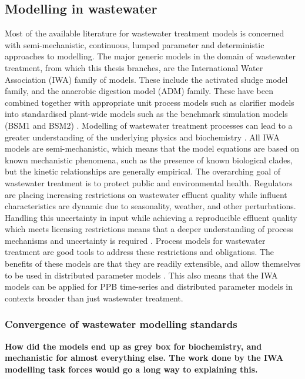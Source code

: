\subsection{Modelling in wastewater}

Most of the available literature for wastewater treatment models is concerned with semi-mechanistic, continuous, lumped parameter and deterministic approaches to modelling. The major generic models in the domain of wastewater treatment, from which this thesis branches, are the International Water Association (IWA) family of models. These include the activated sludge model family, and the anaerobic digestion model (ADM) \cite{batstone2006} family. These have been combined together with appropriate unit process models such as clarifier models \cite{takacs1991} into standardised plant-wide models such as the benchmark simulation models (BSM1 and BSM2) \cite{jeppsson2007, beraud2007}. Modelling of wastewater treatment processes can lead to a greater understanding of the underlying physics and biochemistry \cite{szilvester2010}. All IWA models are semi-mechanistic, which means that the model equations are based on known mechanistic phenomena, such as the presence of known biological clades, but the kinetic relationships are generally empirical.
\skippingparagraph
The overarching goal of wastewater treatment is to protect public and environmental health. Regulators are placing increasing restrictions on wastewater effluent quality while influent characteristics are dynamic due to seasonality, weather, and other perturbations. Handling this uncertainty in input while achieving a reproducible effluent quality which meets licensing restrictions means that a deeper understanding of process mechanisms and uncertainty is required \cite{solon2019}.
Process models for wastewater treatment are good tools to address these restrictions and obligations. The benefits of these models are that they are readily extensible, and allow themselves to be used in distributed parameter models \cite{batstone2006a}. This also means that the IWA models can be applied for PPB time-series and distributed parameter models in contexts broader than just wastewater treatment. 


\subsubsection{Convergence of wastewater modelling standards}
\textbf{How did the models end up as grey box for biochemistry, and mechanistic for almost everything else. The work done by the IWA modelling task forces would go a long way to explaining this. }

